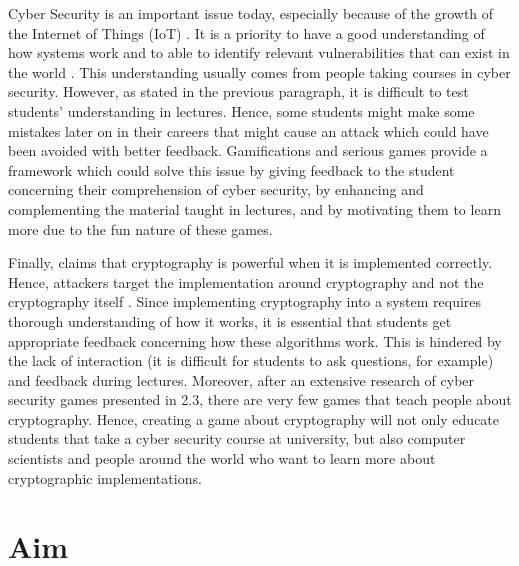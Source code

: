 \documentclass{l4proj}
\begin{document}
Cyber Security is an important issue today, especially because of the growth of the Internet of Things (IoT) \citep{abomhara_cyber_2015}.
It is a priority to have a good understanding of how systems work and to able to identify relevant vulnerabilities that can exist in the world \citep{abomhara_cyber_2015}.
This understanding usually comes from people taking courses in cyber security.
However, as stated in the previous paragraph, it is difficult to test students' understanding in lectures.
Hence, some students might make some mistakes later on in their careers that might cause an attack 
which could have been avoided with better feedback.
Gamifications and serious games provide a framework which could solve this issue 
by giving feedback to the student concerning their comprehension of cyber security, by enhancing and complementing the material taught in lectures,
and by motivating them to learn more due to the fun nature of these games.

Finally, \citet{schneier_security_1998} claims that cryptography is powerful when it is implemented correctly.
Hence, attackers target the implementation around cryptography and not the cryptography itself \citep{schneier_security_1998} \citep{lazar_why_2014}.
Since implementing cryptography into a system requires thorough understanding of how it works,
it is essential that students get appropriate feedback concerning how these algorithms work.
This is hindered by the lack of interaction (it is difficult for students to ask questions, for example) and feedback during lectures.
Moreover, after an extensive research of cyber security games presented in 2.3, there are very few games that teach people about cryptography.
Hence, creating a game about cryptography will not only educate students that take a cyber security course at university, 
but also computer scientists and people around the world who want to learn more about cryptographic implementations.

\section{Aim}
\end{document}
